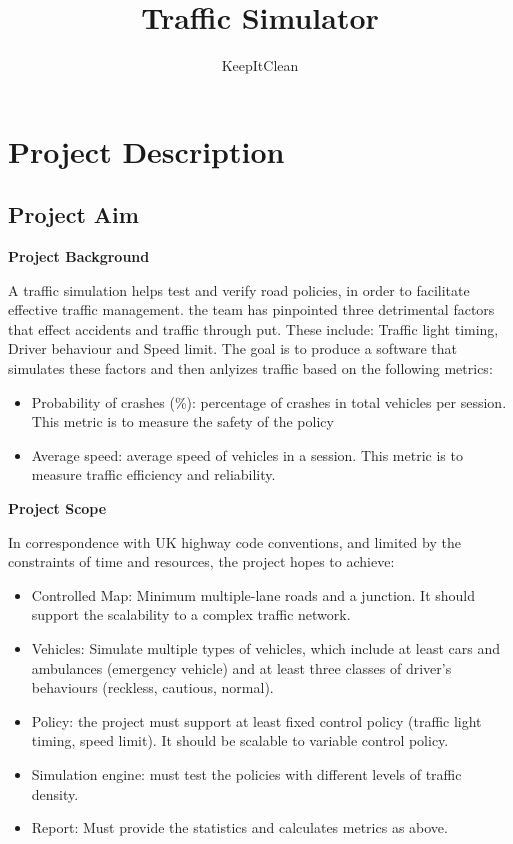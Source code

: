 \documentclass[11pt]{article}
\author{KeepItClean}
\title{Traffic Simulator}
\begin{document}
\maketitle

\section{Project Description}
\subsection{Project Aim}
\begin{flushleft}
\textbf{Project Background}\par	
\end{flushleft}

	A traffic simulation helps test and verify road policies, in order to facilitate effective traffic management.
	 the team has pinpointed three detrimental factors that effect accidents and traffic through put. These include: Traffic light timing, Driver behaviour and Speed limit. The goal is to produce a software that simulates these factors and then anlyizes traffic based on the following metrics:
\begin{itemize}
	\item Probability of crashes (\%): percentage of crashes in total vehicles per session. This metric is to measure the safety of the policy
	\item Average speed: average speed of vehicles in a session. This metric is to measure traffic efficiency and reliability.
\end{itemize}

\begin{flushleft}
\textbf{Project Scope} \par	
\end{flushleft}

 In correspondence with UK highway code conventions, and limited by the constraints of time and resources, the project hopes to achieve:
\begin{itemize}
\item Controlled Map: Minimum multiple-lane roads and a junction. It should support the scalability to a complex traffic network.
\item Vehicles: Simulate multiple types of vehicles, which include at least cars and ambulances (emergency vehicle) and at least three classes of driver’s behaviours (reckless, cautious, normal).
\item Policy: the project must support at least fixed control policy (traffic light timing, speed limit). It should be scalable to variable control policy.
\item Simulation engine: must test the policies with different levels of traffic density.
\item Report: Must provide the statistics and calculates metrics as above.
\end{itemize}
\end{document}
